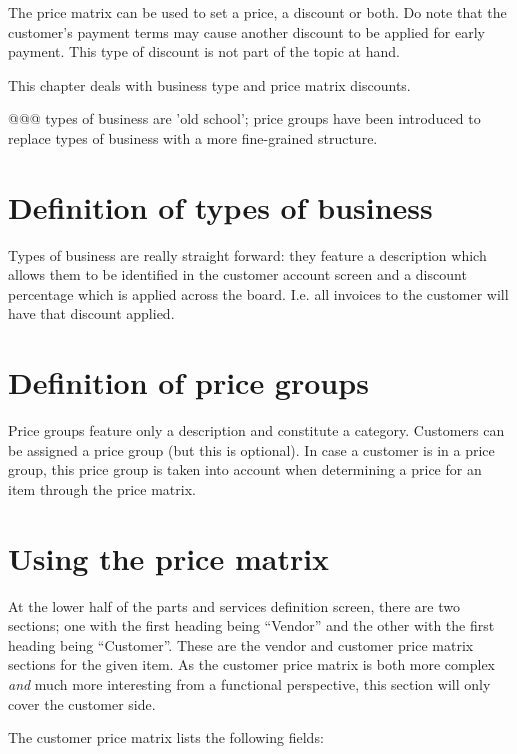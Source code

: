 The price matrix can be used to set a price, a discount or both.  Do note that the \gls{customer}'s payment
terms may cause another discount to be applied for early payment.  This type of discount is not part of the
topic at hand. 

This chapter deals with business type and price matrix discounts.

@@@ types of business are 'old school'; price groups have been introduced to replace types of business with a more fine-grained structure.

\section{Definition of types of business}
\label{sec-pricing-business-types}

Types of business are really straight forward: they feature a description
which allows them to be identified in the \gls{customer} account screen and a discount
percentage which is applied across the board. I.e. all invoices to the customer
will have that discount applied.

\section{Definition of price groups}
\label{sec-pricing-price-groups}

Price groups feature only a description and constitute a category. Customers can be assigned a price group
(but this is optional). In case a customer is in a price group, this price group is taken into account when
determining a price for an item through the price matrix.

\section{Using the price matrix}
\label{sec-pricing-price-matrix}

At the lower half of the parts and services definition screen, there are two sections; one with the first
heading being ``Vendor'' and the other with the first heading being ``Customer''.  These are the vendor and
customer price matrix sections for the given item. As the customer price matrix is both more complex 
\textit{and} much more interesting from a functional perspective, this section will only cover the customer
side.

The customer price matrix lists the following fields:

